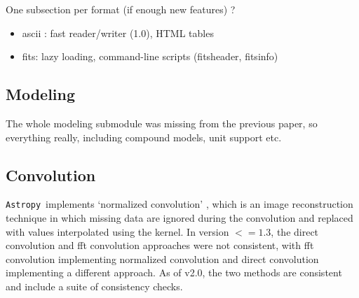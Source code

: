 \documentclass[modern]{aastex61}
\newcommand{\package}[1]{\texttt{#1}}
\newcommand{\astropypkg}{\package{Astropy}}
\begin{document}
One subsection per format (if enough new features) ?

\begin{itemize}
\item ascii : fast reader/writer (1.0), HTML tables
\item fits: lazy loading, command-line scripts (fitsheader, fitsinfo)
\end{itemize}

\subsection{Modeling}
\label{sec:modeling}
The whole modeling submodule was missing from the previous paper, so everything really, including compound models, unit support etc.

\subsection{Convolution}

\astropypkg\ implements `normalized convolution' \citep[e.g.,][]{Knutsson1993}, which is an image reconstruction technique in which missing data are ignored during the convolution and replaced with values interpolated using the kernel.   In version $<=1.3$, the direct convolution and fft convolution approaches were not consistent, with fft convolution implementing normalized convolution and direct convolution implementing a different approach.  As of v2.0, the two methods are consistent and include a suite of consistency checks.
\end{document}
